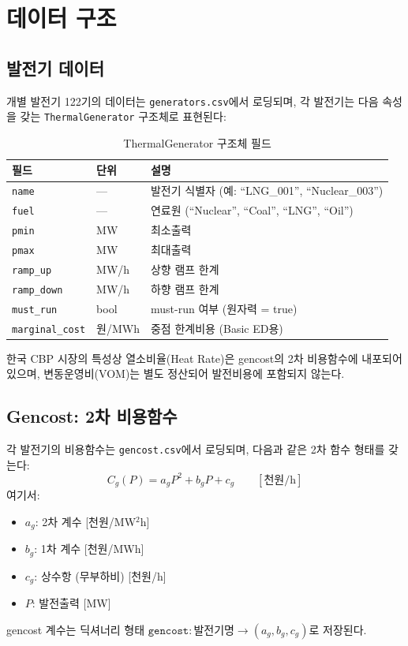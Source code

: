 \documentclass[11pt, a4paper]{article}
\begin{document}
\section{데이터 구조}\label{sec:data}

\subsection{발전기 데이터}

개별 발전기 122기의 데이터는 \texttt{generators.csv}에서 로딩되며,
각 발전기는 다음 속성을 갖는 \texttt{ThermalGenerator} 구조체로 표현된다:

\begin{table}[H]
\centering
\caption{ThermalGenerator 구조체 필드}\label{tab:thermal_gen}
\small
\begin{tabular}{lll}
\toprule
\textbf{필드} & \textbf{단위} & \textbf{설명} \\
\midrule
\texttt{name}           & ---   & 발전기 식별자 (예: ``LNG\_001'', ``Nuclear\_003'') \\
\texttt{fuel}           & ---   & 연료원 (``Nuclear'', ``Coal'', ``LNG'', ``Oil'') \\
\texttt{pmin}           & MW    & 최소출력 \\
\texttt{pmax}           & MW    & 최대출력 \\
\texttt{ramp\_up}       & MW/h  & 상향 램프 한계 \\
\texttt{ramp\_down}     & MW/h  & 하향 램프 한계 \\
\texttt{must\_run}      & bool  & must-run 여부 (원자력 = true) \\
\texttt{marginal\_cost} & 원/MWh & 중점 한계비용 (Basic ED용) \\
\bottomrule
\end{tabular}
\end{table}

한국 CBP 시장의 특성상 열소비율(Heat Rate)은 gencost의 2차 비용함수에 내포되어 있으며,
변동운영비(VOM)는 별도 정산되어 발전비용에 포함되지 않는다.

\subsection{Gencost: 2차 비용함수}\label{sec:gencost}

각 발전기의 비용함수는 \texttt{gencost.csv}에서 로딩되며, 다음과 같은 2차 함수 형태를 갖는다:
\begin{equation}\label{eq:gencost}
    C_g(P) = a_g P^2 + b_g P + c_g \qquad [\text{천원/h}]
\end{equation}
여기서:
\begin{itemize}[noitemsep]
    \item $a_g$: 2차 계수 [천원/MW$^2$h]
    \item $b_g$: 1차 계수 [천원/MWh]
    \item $c_g$: 상수항 (무부하비) [천원/h]
    \item $P$: 발전출력 [MW]
\end{itemize}
gencost 계수는 딕셔너리 형태 $\texttt{gencost} : \text{발전기명} \to (a_g, b_g, c_g)$로 저장된다.
\end{document}
